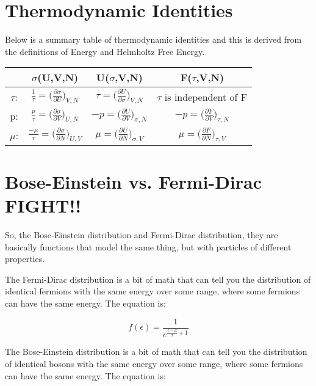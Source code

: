 \documentclass[arial]{article}
\begin{document}
\section*{Thermodynamic Identities}
Below is a summary table of thermodynamic identities and this is derived from the definitions of Energy and Helmholtz Free Energy.
\begin{table}[h!]
	\centering
	\begin{tabular}{||c c c c||} 
		\hline
		 & $\sigma$(U,V,N) & U($\sigma$,V,N) & F($\tau$,V,N) \\ [0.5ex] 
		\hline\hline
		$\tau$: & $\frac{1}{\tau}=\Big(\frac{\partial \sigma}{\partial U}\Big)_{V,N}$ & $\tau=\Big(\frac{\partial U}{\partial \sigma}\Big)_{V,N}$ & $\tau$ is independent of F \\ 
		p:&$\frac{p}{\tau}=\Big(\frac{\partial \sigma}{\partial V}\Big)_{U,N}$ & $-p=\Big(\frac{\partial U}{\partial V}\Big)_{\sigma,N}$ & $-p=\Big(\frac{\partial F}{\partial V}\Big)_{\tau,N}$ \\
		$\mu$: & $\frac{-\mu}{\tau}=\Big(\frac{\partial \sigma}{\partial N}\Big)_{U,V}$ & $\mu=\Big(\frac{\partial U}{\partial N}\Big)_{\sigma,V}$ & $\mu=\Big(\frac{\partial F}{\partial N}\Big)_{\tau,V}$ \\ [1ex] 
		\hline
	\end{tabular}
	\label{table:1}
\end{table}

\section*{Bose-Einstein vs. Fermi-Dirac			\hspace{6.7cm}\textbf{FIGHT!!}}
So, the Bose-Einstein distribution and Fermi-Dirac distribution, they are basically functions that model the same thing, but with particles of different properties.
\vspace{3mm}

The Fermi-Dirac distribution is a bit of math that can tell you the distribution of identical fermions with the same energy over some range, where some fermions can have the same energy. The equation is:

\begin{equation}
f(\epsilon)=\frac{1}{e^{\frac{\epsilon-\mu}{\tau}+1}}
\end{equation}

The Bose-Einstein distribution is a bit of math that can tell you the distribution of identical bosons with the same energy over some range, where some fermions can have the same energy. The equation is:
\end{document}
